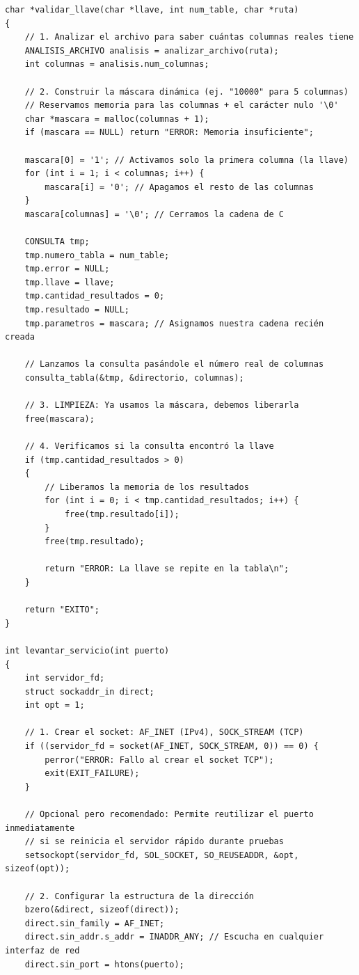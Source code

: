 \documentclass[12pt]{article}
\begin{document}
\begin{lstlisting}[style=estiloC ,title={Código 1. Servidor TCP (funciones.h)}]
char *validar_llave(char *llave, int num_table, char *ruta)
{
    // 1. Analizar el archivo para saber cuántas columnas reales tiene
    ANALISIS_ARCHIVO analisis = analizar_archivo(ruta);
    int columnas = analisis.num_columnas;

    // 2. Construir la máscara dinámica (ej. "10000" para 5 columnas)
    // Reservamos memoria para las columnas + el carácter nulo '\0'
    char *mascara = malloc(columnas + 1);
    if (mascara == NULL) return "ERROR: Memoria insuficiente";

    mascara[0] = '1'; // Activamos solo la primera columna (la llave)
    for (int i = 1; i < columnas; i++) {
        mascara[i] = '0'; // Apagamos el resto de las columnas
    }
    mascara[columnas] = '\0'; // Cerramos la cadena de C

    CONSULTA tmp;
    tmp.numero_tabla = num_table;
    tmp.error = NULL;
    tmp.llave = llave;
    tmp.cantidad_resultados = 0;
    tmp.resultado = NULL;
    tmp.parametros = mascara; // Asignamos nuestra cadena recién creada

    // Lanzamos la consulta pasándole el número real de columnas
    consulta_tabla(&tmp, &directorio, columnas);

    // 3. LIMPIEZA: Ya usamos la máscara, debemos liberarla
    free(mascara); 

    // 4. Verificamos si la consulta encontró la llave
    if (tmp.cantidad_resultados > 0)
    {
        // Liberamos la memoria de los resultados
        for (int i = 0; i < tmp.cantidad_resultados; i++) {
            free(tmp.resultado[i]);
        }
        free(tmp.resultado);

        return "ERROR: La llave se repite en la tabla\n";
    }

    return "EXITO";
}

int levantar_servicio(int puerto)
{
    int servidor_fd;
    struct sockaddr_in direct;
    int opt = 1;

    // 1. Crear el socket: AF_INET (IPv4), SOCK_STREAM (TCP)
    if ((servidor_fd = socket(AF_INET, SOCK_STREAM, 0)) == 0) {
        perror("ERROR: Fallo al crear el socket TCP");
        exit(EXIT_FAILURE);
    }

    // Opcional pero recomendado: Permite reutilizar el puerto inmediatamente 
    // si se reinicia el servidor rápido durante pruebas
    setsockopt(servidor_fd, SOL_SOCKET, SO_REUSEADDR, &opt, sizeof(opt));

    // 2. Configurar la estructura de la dirección
    bzero(&direct, sizeof(direct));
    direct.sin_family = AF_INET;
    direct.sin_addr.s_addr = INADDR_ANY; // Escucha en cualquier interfaz de red
    direct.sin_port = htons(puerto);


\end{lstlisting}
\end{document}
